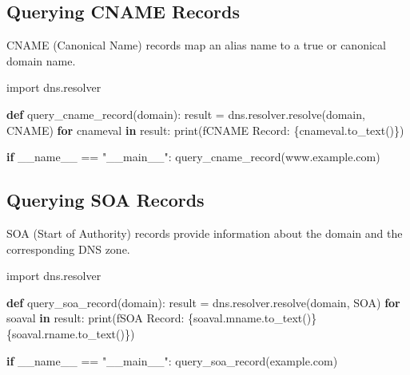 \documentclass[
  letterpaper,
  DIV=11,
  numbers=noendperiod]{scrreprt}
\newenvironment{Shaded}{\begin{snugshade}}{\end{snugshade}}
\newcommand{\BuiltInTok}[1]{\textcolor[rgb]{0.00,0.23,0.31}{#1}}
\newcommand{\ControlFlowTok}[1]{\textcolor[rgb]{0.00,0.23,0.31}{\textbf{#1}}}
\newcommand{\ImportTok}[1]{\textcolor[rgb]{0.00,0.46,0.62}{#1}}
\newcommand{\KeywordTok}[1]{\textcolor[rgb]{0.00,0.23,0.31}{\textbf{#1}}}
\newcommand{\NormalTok}[1]{\textcolor[rgb]{0.00,0.23,0.31}{#1}}
\newcommand{\OperatorTok}[1]{\textcolor[rgb]{0.37,0.37,0.37}{#1}}
\newcommand{\SpecialCharTok}[1]{\textcolor[rgb]{0.37,0.37,0.37}{#1}}
\newcommand{\SpecialStringTok}[1]{\textcolor[rgb]{0.13,0.47,0.30}{#1}}
\newcommand{\StringTok}[1]{\textcolor[rgb]{0.13,0.47,0.30}{#1}}
\newcommand{\VariableTok}[1]{\textcolor[rgb]{0.07,0.07,0.07}{#1}}
\begin{document}
\subsection{Querying CNAME Records}\label{querying-cname-records}

CNAME (Canonical Name) records map an alias name to a true or canonical
domain name.

\begin{Shaded}
\begin{Highlighting}[]
\ImportTok{import}\NormalTok{ dns.resolver}

\KeywordTok{def}\NormalTok{ query\_cname\_record(domain):}
\NormalTok{    result }\OperatorTok{=}\NormalTok{ dns.resolver.resolve(domain, }\StringTok{\textquotesingle{}CNAME\textquotesingle{}}\NormalTok{)}
    \ControlFlowTok{for}\NormalTok{ cnameval }\KeywordTok{in}\NormalTok{ result:}
        \BuiltInTok{print}\NormalTok{(}\SpecialStringTok{f\textquotesingle{}CNAME Record: }\SpecialCharTok{\{}\NormalTok{cnameval}\SpecialCharTok{.}\NormalTok{to\_text()}\SpecialCharTok{\}}\SpecialStringTok{\textquotesingle{}}\NormalTok{)}

\ControlFlowTok{if} \VariableTok{\_\_name\_\_} \OperatorTok{==} \StringTok{"\_\_main\_\_"}\NormalTok{:}
\NormalTok{    query\_cname\_record(}\StringTok{\textquotesingle{}www.example.com\textquotesingle{}}\NormalTok{)}
\end{Highlighting}
\end{Shaded}

\subsection{Querying SOA Records}\label{querying-soa-records}

SOA (Start of Authority) records provide information about the domain
and the corresponding DNS zone.

\begin{Shaded}
\begin{Highlighting}[]
\ImportTok{import}\NormalTok{ dns.resolver}

\KeywordTok{def}\NormalTok{ query\_soa\_record(domain):}
\NormalTok{    result }\OperatorTok{=}\NormalTok{ dns.resolver.resolve(domain, }\StringTok{\textquotesingle{}SOA\textquotesingle{}}\NormalTok{)}
    \ControlFlowTok{for}\NormalTok{ soaval }\KeywordTok{in}\NormalTok{ result:}
        \BuiltInTok{print}\NormalTok{(}\SpecialStringTok{f\textquotesingle{}SOA Record: }\SpecialCharTok{\{}\NormalTok{soaval}\SpecialCharTok{.}\NormalTok{mname}\SpecialCharTok{.}\NormalTok{to\_text()}\SpecialCharTok{\}}\SpecialStringTok{ }\SpecialCharTok{\{}\NormalTok{soaval}\SpecialCharTok{.}\NormalTok{rname}\SpecialCharTok{.}\NormalTok{to\_text()}\SpecialCharTok{\}}\SpecialStringTok{\textquotesingle{}}\NormalTok{)}

\ControlFlowTok{if} \VariableTok{\_\_name\_\_} \OperatorTok{==} \StringTok{"\_\_main\_\_"}\NormalTok{:}
\NormalTok{    query\_soa\_record(}\StringTok{\textquotesingle{}example.com\textquotesingle{}}\NormalTok{)}
\end{Highlighting}
\end{Shaded}
\end{document}
